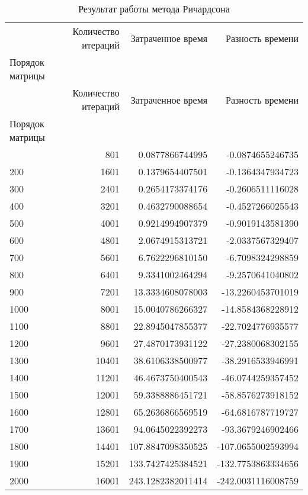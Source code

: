 \begin{longtable}{lrrr}
\label{rich}\\
\caption{Результат работы метода Ричардсона}\\
\toprule
 & Количество итераций & Затраченное время & Разность времени \\
Порядок матрицы &  &  &  \\
\midrule
\endfirsthead
\toprule
 & Количество итераций & Затраченное время & Разность времени \\
Порядок матрицы &  &  &  \\
\midrule
\endhead
\midrule
\midrule
\endfoot
\bottomrule
\endlastfoot
100 & 801 & 0.0877866744995 & -0.0874655246735 \\
200 & 1601 & 0.1379654407501 & -0.1364347934723 \\
300 & 2401 & 0.2654173374176 & -0.2606511116028 \\
400 & 3201 & 0.4632790088654 & -0.4527266025543 \\
500 & 4001 & 0.9214994907379 & -0.9019143581390 \\
600 & 4801 & 2.0674915313721 & -2.0337567329407 \\
700 & 5601 & 6.7622296810150 & -6.7098324298859 \\
800 & 6401 & 9.3341002464294 & -9.2570641040802 \\
900 & 7201 & 13.3334608078003 & -13.2260453701019 \\
1000 & 8001 & 15.0040786266327 & -14.8584368228912 \\
1100 & 8801 & 22.8945047855377 & -22.7024776935577 \\
1200 & 9601 & 27.4870173931122 & -27.2380068302155 \\
1300 & 10401 & 38.6106338500977 & -38.2916533946991 \\
1400 & 11201 & 46.4673750400543 & -46.0744259357452 \\
1500 & 12001 & 59.3388886451721 & -58.8576273918152 \\
1600 & 12801 & 65.2636866569519 & -64.6816787719727 \\
1700 & 13601 & 94.0645022392273 & -93.3679246902466 \\
1800 & 14401 & 107.8847098350525 & -107.0655002593994 \\
1900 & 15201 & 133.7427425384521 & -132.7753863334656 \\
2000 & 16001 & 243.1282382011414 & -242.0031116008759 \\
\end{longtable}

